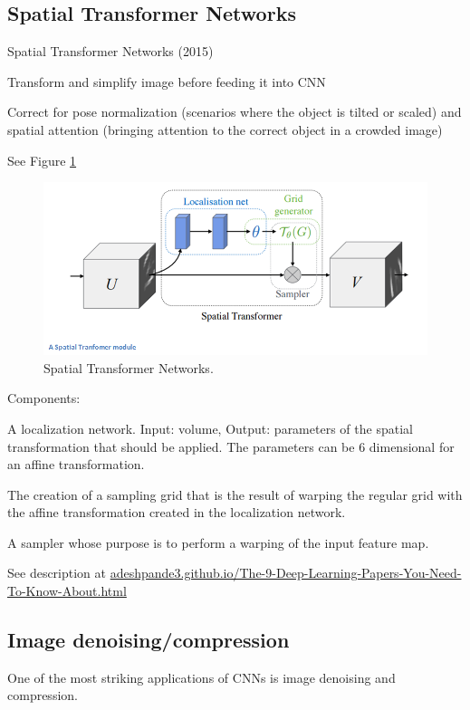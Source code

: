 \documentclass[english]{article}
\begin{document}
\subsection{Spatial Transformer Networks}
\benum
\item Spatial Transformer Networks  (2015)

Transform and simplify image before feeding it into CNN

Correct for pose normalization (scenarios where the object is tilted or scaled) and spatial attention (bringing attention to the correct object in a crowded image)

 See Figure \ref{STN}

\begin{figure}
  \centering
  \includegraphics[scale=0.4]{SpatialTransformer}
  \caption{Spatial Transformer Networks.}
  \label{STN}
\end{figure}

Components: 

A localization network. Input: volume, Output: parameters of the spatial transformation that should be applied. The parameters can be 6 dimensional for an affine transformation.

The creation of a sampling grid that is the result of warping the regular grid with the affine transformation created in the localization network.

A sampler whose purpose is to perform a warping of the input feature map.

See description at \url{adeshpande3.github.io/The-9-Deep-Learning-Papers-You-Need-To-Know-About.html}
\eenum 


\subsection{Image denoising/compression}
\benum
\item One of the most striking applications of CNNs is image denoising and compression. 
\end{document}
